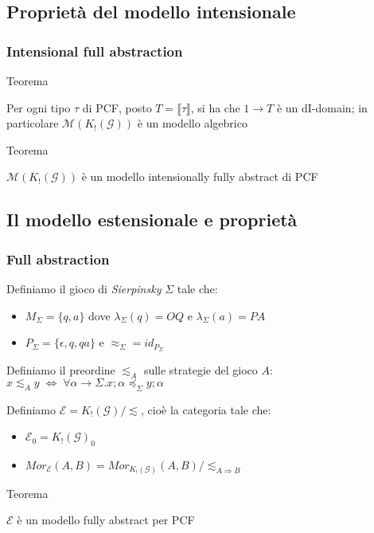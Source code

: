 \documentclass{beamer}
\begin{document}
\subsection{Proprietà del modello intensionale}

\begin{frame}
	
	\frametitle{Intensional full abstraction}
	
	
	\begin{block}{Teorema}
		
		Per ogni tipo $\tau$ di PCF, posto $T= \llbracket \tau \rrbracket$, si ha che $1 \rightarrow T$ è un dI-domain;
		in particolare $\mathcal{M}(K_! (\mathcal{G}) )$ è un modello algebrico
		
	\end{block}
	
	
	\begin{block}{Teorema}
		
		$\mathcal{M}(K_! (\mathcal{G}) )$ è un modello intensionally fully abstract di PCF
		
	\end{block}
	
	
\end{frame}


\subsection{Il modello estensionale e proprietà}

\begin{frame}
	
	\frametitle{Full abstraction}
	
	Definiamo il gioco di \emph{Sierpinsky} $\Sigma$ tale che:
	\begin{itemize}
		\item $M_\Sigma = \{ q,a \}$ dove $\lambda_\Sigma (q)=OQ$ e $\lambda_\Sigma (a)=PA$
		\item $P_\Sigma = \{ \epsilon , q , qa \}$ e $\approx_\Sigma = id_{P_\Sigma}$
	\end{itemize}
	
	Definiamo il preordine $\lesssim_A$ sulle strategie del gioco $A$: $x \lesssim_A y \; \Leftrightarrow \; \forall \alpha \rightarrow \Sigma . x;\alpha \preccurlyeq_\Sigma y;\alpha$
	
	Definiamo $\mathcal{E} = K_!(\mathcal{G}) / \lesssim$, cioè la categoria tale che:
	\begin{itemize}
		\item $\mathcal{E}_0 = K_!(\mathcal{G})_0$
		\item $Mor_{\mathcal{E}}(A,B) = Mor_{K_!(\mathcal{G})}(A,B) / \lesssim_{A\Rightarrow B}$
	\end{itemize}

	
	\begin{block}{Teorema}
		
		$\mathcal{E}$ è un modello fully abstract per PCF
		
	\end{block}
	
\end{frame}
\end{document}
